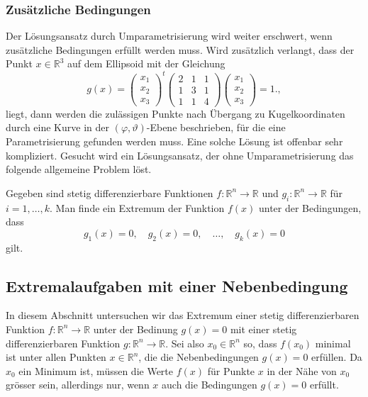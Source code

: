 %
%
\subsubsection{Zusätzliche Bedingungen}
Der Lösungsansatz durch Umparametrisierung wird weiter erschwert,
wenn zusätzliche Bedingungen erfüllt werden muss.
Wird zusätzlich verlangt, dass der Punkt $x\in\mathbb{R}^3$ auf
dem Ellipsoid mit der Gleichung
\begin{equation}
g(x)
=
\begin{pmatrix}
x_1\\x_2\\x_3
\end{pmatrix}^t
\begin{pmatrix}
2&1&1\\
1&3&1\\
1&1&4
\end{pmatrix}
\begin{pmatrix}
x_1\\x_2\\x_3
\end{pmatrix}
=
1.
\label{buch:fuvar:nebenbedingungen:eqn:beispielg},
\end{equation}
liegt, dann werden die zulässigen Punkte nach Übergang zu Kugelkoordinaten
durch eine Kurve in der
$(\varphi,\vartheta)$-Ebene beschrieben, für die eine Parametrisierung
gefunden werden muss.
Eine solche Lösung ist offenbar sehr kompliziert.
Gesucht wird ein Lösungsansatz, der ohne Umparametrisierung das folgende
allgemeine Problem löst.

\begin{aufgabe}
\label{buch:fuvar:nebenbedingungen:aufgabe:grund}
Gegeben sind stetig differenzierbare Funktionen
$f\colon\mathbb{R}^n\to\mathbb{R}$ und
$g_i\colon\mathbb{R}^n\to\mathbb{R}$ für $i=1,\dots,k$.
Man finde ein Extremum der Funktion $f(x)$ unter der Bedingungen,
dass
\[
g_1(x) = 0,\quad g_2(x)=0,\quad\dots,\quad g_k(x)=0
\]
gilt.
\end{aufgabe}

%
%
\subsection{Extremalaufgaben mit einer Nebenbedingung}
In diesem Abschnitt untersuchen wir das Extremum einer stetig
differenzierbaren Funktion $f\colon\mathbb{R}^n\to\mathbb{R}$
unter der Bedinung $g(x)=0$ mit einer stetig differenzierbaren
Funktion $g\colon\mathbb{R}^n\to\mathbb{R}$.
Sei also $x_0\in\mathbb{R}^n$ so, dass $f(x_0)$ minimal ist unter
allen Punkten $x\in \mathbb{R}^n$, die die Nebenbedingungen $g(x)=0$
erfüllen.
Da $x_0$ ein Minimum ist, müssen die Werte $f(x)$ für Punkte $x$
in der Nähe von $x_0$ grösser sein, allerdings nur, wenn $x$ auch
die Bedingungen $g(x)=0$ erfüllt.

